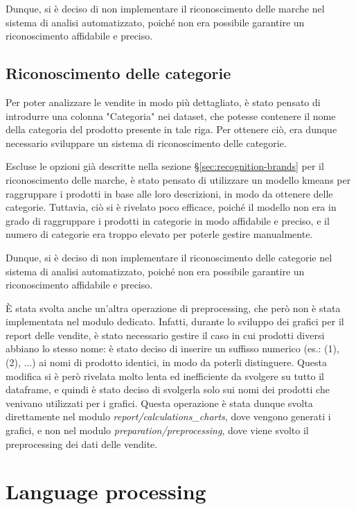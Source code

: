 Dunque, si è deciso di non implementare il riconoscimento delle marche nel sistema di analisi automatizzato, poiché non era possibile garantire un riconoscimento affidabile e preciso.


\subsection{Riconoscimento delle categorie}
\label{sec:recognition-categories}

Per poter analizzare le vendite in modo più dettagliato, è stato pensato di introdurre una colonna "Categoria" nei dataset, che potesse contenere il nome della categoria del prodotto presente in tale riga. Per ottenere ciò, era dunque necessario sviluppare un sistema di riconoscimento delle categorie.

Escluse le opzioni già descritte nella sezione \S\ref{sec:recognition-brands} per il riconoscimento delle marche, è stato pensato di utilizzare un modello \gls{kmeans}{} per raggruppare i prodotti in base alle loro descrizioni, in modo da ottenere delle categorie. Tuttavia, ciò si è rivelato poco efficace, poiché il modello non era in grado di raggruppare i prodotti in categorie in modo affidabile e preciso, e il numero di categorie era troppo elevato per poterle gestire manualmente.

Dunque, si è deciso di non implementare il riconoscimento delle categorie nel sistema di analisi automatizzato, poiché non era possibile garantire un riconoscimento affidabile e preciso.


È stata svolta anche un'altra operazione di preprocessing, che però non è stata implementata nel modulo dedicato.
Infatti, durante lo sviluppo dei grafici per il report delle vendite, è stato necessario gestire il caso in cui prodotti diversi abbiano lo stesso nome: è stato deciso di inserire un suffisso numerico (es.: (1), (2), ...) ai nomi di prodotto identici, in modo da poterli distinguere. Questa modifica si è però rivelata molto lenta ed inefficiente da svolgere su tutto il dataframe, e quindi è stato deciso di svolgerla solo sui nomi dei prodotti che venivano utilizzati per i grafici.
Questa operazione è stata dunque svolta direttamente nel modulo \emph{report/calculations\_charts}, dove vengono generati i grafici, e non nel modulo \emph{preparation/preprocessing}, dove viene svolto il preprocessing dei dati delle vendite.



\section{Language processing}
\label{sec:language-processing}

